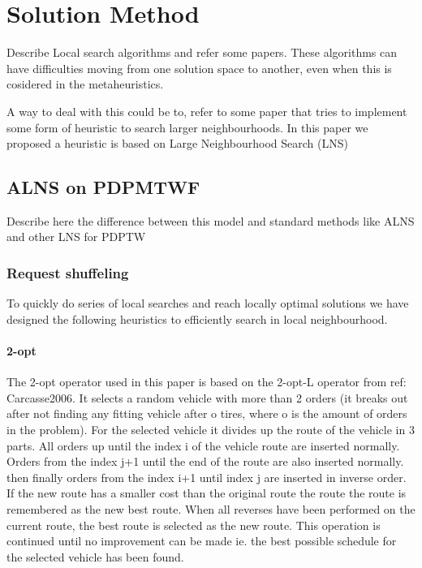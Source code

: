 \documentclass[../main.tex]{subfiles}
\begin{document}
                                                
\chapter{Solution Method}
Describe Local search algorithms and refer some papers. 
These algorithms can have difficulties moving from one solution space to another, even when this is cosidered in the metaheuristics. \par
A way to deal with this could be to, refer to some paper that tries to implement some form of heuristic to search larger neighbourhoods.
In this paper we proposed a heuristic is based on \cite{shaw97} Large Neighbourhood Search (LNS) 

\section{ALNS on PDPMTWF}
Describe here the difference between this model and standard methods like ALNS and other LNS for PDPTW

\subsection{Request shuffeling}
To quickly do series of local searches and reach locally optimal solutions we have designed the following heuristics to efficiently search in local neighbourhood.

\subsubsection{2-opt}
The 2-opt operator used in this paper is based on the 2-opt-L operator from {ref: Carcasse2006}. 
It selects a random vehicle with more than 2 orders (it breaks out after not finding any fitting vehicle after o tires, where o is the amount of orders in the problem).
For the selected vehicle it divides up the route of the vehicle in 3 parts. 
All orders up until the index i of the vehicle route are inserted normally. 
Orders from the index j+1 until the end of the route are also inserted normally. 
then finally orders from the index i+1 until index j are inserted in inverse order.
If the new route has a smaller cost than the original route the route the route is remembered as the new best route. 
When all reverses have been performed on the current route, the best route is selected as the new route.
This operation is continued until no improvement can be made ie. the best possible schedule for the selected vehicle has been found.
\end{document}
